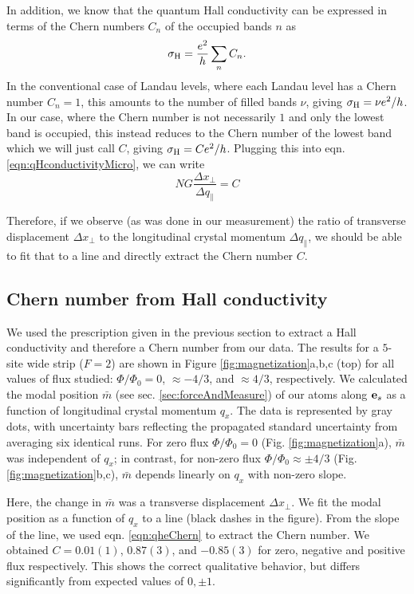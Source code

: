 In addition, we know that the quantum Hall conductivity can be expressed in terms of the Chern numbers $C_n$ of the occupied bands $n$ as
\begin{equation}
 \sigma_{\rm{H}} = \frac{e^2}{h}\sum_n C_n.
\end{equation}
In the conventional case of Landau levels, where each Landau level has a Chern number $C_n=1$, this amounts to the number of filled bands $\nu$, giving $\sigma_{\rm{H}} = \nu e^2/h$. In our case, where the Chern number is not necessarily $1$ and only the lowest band is occupied, this instead reduces to the Chern number of the lowest band which we will just call $C$, giving $\sigma_{\rm{H}} = C e^2/h$. Plugging this into eqn. \ref{eqn:qHconductivityMicro}, we can write
\begin{equation}
N G\frac{\Delta x_{\perp}}{\Delta q_{\parallel}} = C
\label{eqn:qheChern}
\end{equation}

Therefore, if we observe (as was done in our measurement) the ratio of transverse displacement $\Delta x_{\perp}$ to the longitudinal crystal momentum $\Delta q_{\parallel}$, we should be able to fit that to a line and directly extract the Chern number $C$.

\subsection{Chern number from Hall conductivity}
We used the prescription given in the previous section to extract a Hall conductivity and therefore a Chern number from our data. The results for a $5$-site wide strip ($F=2$) are shown in Figure \ref{fig:magnetization}a,b,c (top) for all values of flux studied: $\Phi/\Phi_0 =0$, $\approx -4/3$, and  $\approx 4/3$, respectively. We calculated the modal position $\bar{m}$ (see sec. \ref{sec:forceAndMeasure}) of our atoms along $\textbf{e}_s{}$ as a function of longitudinal crystal momentum $q_x$.  The data is represented by gray dots, with uncertainty bars reflecting the propagated standard uncertainty from averaging six identical runs. For zero flux $\Phi/\Phi_0=0$ (Fig. \ref{fig:magnetization}a), $\bar{m}$ was independent of $q_x$; in contrast, for non-zero flux $\Phi/\Phi_0\approx\pm4/3$  (Fig. \ref{fig:magnetization}b,c),  $\bar{m}$ depends linearly on $q_x$ with non-zero slope.

Here, the change in $\bar{m}$ was a transverse displacement $\Delta x_{\perp}$. We fit the modal position as a function of $q_x$ to a line (black dashes in the figure). From the slope of the line, we used eqn. \ref{eqn:qheChern} to extract the Chern number. We obtained $C = 0.01(1)$, $0.87(3)$, and $-0.85(3)$ for zero, negative and positive flux respectively. This shows the correct qualitative behavior, but differs significantly from expected values of $0,\pm1$. 

